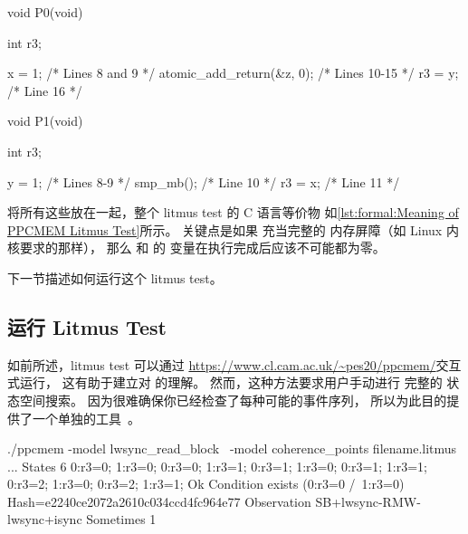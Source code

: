 \QuickQuizEnd

\begin{listing}
\begin{VerbatimL}
void P0(void)
{
	int r3;

	x = 1; /* Lines 8 and 9 */
	atomic_add_return(&z, 0); /* Lines 10-15 */
	r3 = y; /* Line 16 */
}

void P1(void)
{
	int r3;

	y = 1; /* Lines 8-9 */
	smp_mb(); /* Line 10 */
	r3 = x; /* Line 11 */
}
\end{VerbatimL}
\caption{PPCMEM Litmus Test 的含义}
\label{lst:formal:Meaning of PPCMEM Litmus Test}
\end{listing}

将所有这些放在一起，整个 litmus test 的 C 语言等价物
如\cref{lst:formal:Meaning of PPCMEM Litmus Test}所示。
关键点是如果  充当完整的
内存屏障（如 Linux 内核要求的那样），
那么  和  的 
变量在执行完成后应该不可能都为零。

下一节描述如何运行这个 litmus test。

\subsection{运行 Litmus Test}
\label{sec:formal:Running a Litmus Test}

如前所述，litmus test 可以通过
\url{https://www.cl.cam.ac.uk/~pes20/ppcmem/}交互式运行，
这有助于建立对  的理解。
然而，这种方法要求用户手动进行
完整的 状态空间搜索。
因为很难确保你已经检查了每种可能的事件序列，
所以为此目的提供了一个单独的工具~\cite{PaulEMcKenney2011ppcmem}。

\begin{listing}
\begin{VerbatimL}[numbers=none,xleftmargin=0pt]
./ppcmem -model lwsync_read_block \
         -model coherence_points filename.litmus
...
States 6
0:r3=0; 1:r3=0;
0:r3=0; 1:r3=1;
0:r3=1; 1:r3=0;
0:r3=1; 1:r3=1;
0:r3=2; 1:r3=0;
0:r3=2; 1:r3=1;
Ok
Condition exists (0:r3=0 /\ 1:r3=0)
Hash=e2240ce2072a2610c034ccd4fc964e77
Observation SB+lwsync-RMW-lwsync+isync Sometimes 1
\end{VerbatimL}
\caption{PPCMEM 检测到错误}
\label{lst:formal:PPCMEM Detects an Error}
\end{listing}

